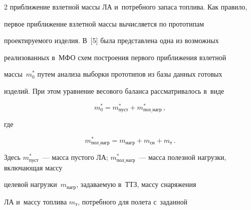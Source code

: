 \begin{multicols}{2}
приближение взлетной массы ЛА и~потребного запаса топ\-ли\-ва. Как правило, 


первое при\-бли\-же\-ние взлетной массы вычисляется по прототипам 


проектируемого изделия. В~[5] была представлена одна из возможных 


реализованных в~МФО схем по\-стро\-ения первого приближения взлетной 


массы~$m_0^*$ путем анализа выборки прототипов из базы данных готовых 


изделий. При этом уравнение весового баланса рас\-смат\-ри\-ва\-лось в~виде


  $$


  m_0^*= m^*_{\mathrm{пуст}} +m^*_{\mathrm{пол\_нагр}}\,,


  $$


  


  \vspace*{-7pt}


  


  \noindent


  где


  


  \vspace*{-3pt}


  


  \noindent


  $$


  m^*_{\mathrm{пол\_нагр}} =m_{\mathrm{нагр}} +m_{\mathrm{сн}} + 


m_{\mathrm{т}}\,.


  $$


  


  \vspace*{-4pt}


  


  \noindent


Здесь $m^*_{\mathrm{пуст}}$~--- масса пустого ЛА; $ 


m^*_{\mathrm{пол\_нагр}}$~--- масса полезной нагрузки, вклю\-ча\-ющая массу 


целевой на\-груз\-ки~$ m_{\mathrm{нагр}}$, за\-да\-ва\-емую в~ТТЗ, массу снаряжения 


ЛА  и~массу топ\-ли\-ва $ m_{\mathrm{т}}$, потребного для полета с~заданной 



\end{multicols}

